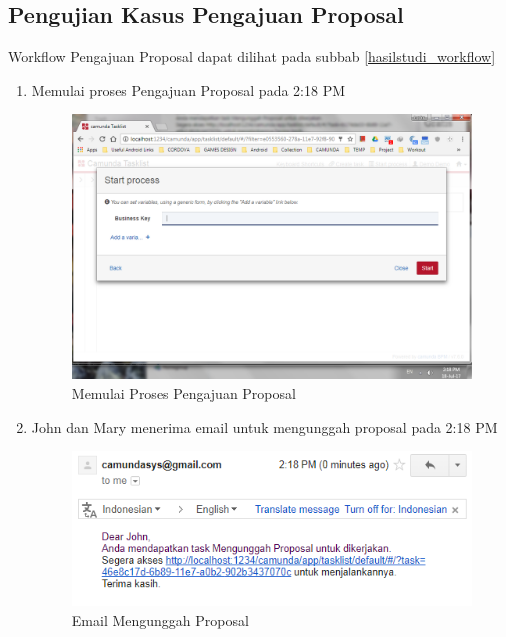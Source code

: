\subsection{Pengujian Kasus Pengajuan Proposal}
\label{pengujian_kasus1}
Workflow Pengajuan Proposal dapat dilihat pada subbab \ref{hasilstudi_workflow}
\begin{enumerate}
	\item Memulai proses Pengajuan Proposal pada 2:18 PM
		\begin{figure}[H]
			\centering
			\includegraphics[scale=0.5]{Gambar/Bab-5/kasus1/1}
			\caption{Memulai Proses Pengajuan Proposal} 
			\label{fig:pengujian_kasus1_1}
	\end{figure}
	
		\item John dan Mary menerima email untuk mengunggah proposal pada 2:18 PM
		\begin{figure}[H]
			\centering
			\includegraphics[scale=0.8]{Gambar/Bab-5/kasus1/2}
			\caption{Email Mengunggah Proposal} 
			\label{fig:pengujian_kasus1_2}
	\end{figure}
	

\end{enumerate}
